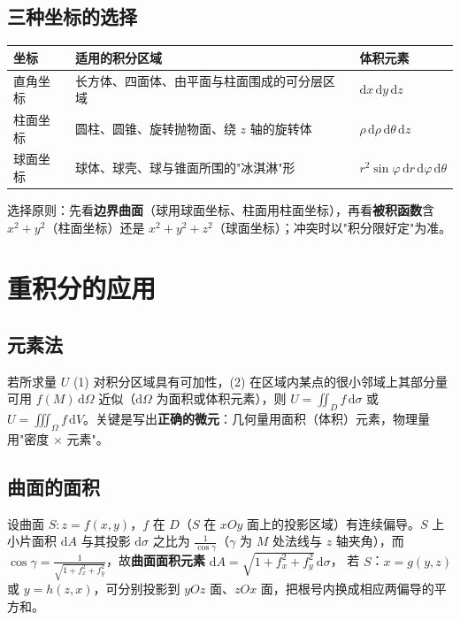 
\subsection{三种坐标的选择}

\begin{center}
\begin{tabular}{@{}lll@{}}
\toprule
坐标 & 适用的积分区域 & 体积元素 \\
\midrule
直角坐标 & 长方体、四面体、由平面与柱面围成的可分层区域 & $\mathrm{d}x\,\mathrm{d}y\,\mathrm{d}z$ \\
柱面坐标 & 圆柱、圆锥、旋转抛物面、绕 $z$ 轴的旋转体 & $\rho\,\mathrm{d}\rho\,\mathrm{d}\theta\,\mathrm{d}z$ \\
球面坐标 & 球体、球壳、球与锥面所围的"冰淇淋"形 & $r^{2}\sin\varphi\,\mathrm{d}r\,\mathrm{d}\varphi\,\mathrm{d}\theta$ \\
\bottomrule
\end{tabular}
\end{center}

选择原则：先看\textbf{边界曲面}（球用球面坐标、柱面用柱面坐标），再看\textbf{被积函数}含 $x^2+y^2$（柱面坐标）还是 $x^2+y^2+z^2$（球面坐标）；冲突时以"积分限好定"为准。

\section{重积分的应用}
\subsection{元素法}

若所求量 $U$ (1) 对积分区域具有可加性，(2) 在区域内某点的很小邻域上其部分量可用 $f(M)\,\mathrm{d}\Omega$ 近似（$\mathrm{d}\Omega$ 为面积或体积元素），则 $U=\iint_Df\,\mathrm{d}\sigma$ 或 $U=\iiint_\Omega f\,\mathrm{d}V$。关键是写出\textbf{正确的微元}：几何量用面积（体积）元素，物理量用"密度 $\times$ 元素"。

\subsection{曲面的面积}

设曲面 $S:z=f(x,y)$，$f$ 在 $D$（$S$ 在 $xOy$ 面上的投影区域）有连续偏导。$S$ 上小片面积 $\mathrm{d}A$ 与其投影 $\mathrm{d}\sigma$ 之比为 $\frac{1}{\cos\gamma}$（$\gamma$ 为 $M$ 处法线与 $z$ 轴夹角），而 $\cos\gamma=\frac{1}{\sqrt{1+f_x^2+f_y^2}}$，故\textbf{曲面面积元素} $\mathrm{d}A=\sqrt{1+f_x^2+f_y^2}\,\mathrm{d}\sigma$，
若 $S$：$x=g(y,z)$ 或 $y=h(z,x)$，可分别投影到 $yOz$ 面、$zOx$ 面，把根号内换成相应两偏导的平方和。

